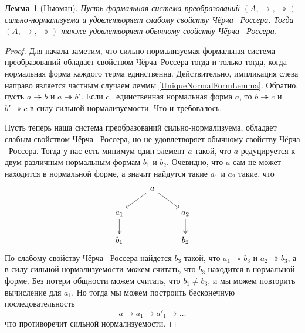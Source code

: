 \documentclass{article}[12pt]
\newtheorem{lemma}{Лемма}
\newcommand{\dash}{\textemdash\ }
\begin{document}
\begin{lemma}[Ньюман]
    \label{NewmanLemma}
    Пусть формальная система преобразований $(A, \rightarrow, \twoheadrightarrow)$ \\ сильно-нормализуема
    и удовлетворяет слабому свойству Чёрча \dash Россера. Тогда $(A, \rightarrow, \twoheadrightarrow)$
    также удовлетворяет обычному свойству Чёрча \dash Россера.
\end{lemma}
\begin{proof}
    Для начала заметим, что сильно-нормализуемая формальная система преобразований обладает свойством
    Чёрча\dash Россера тогда и только тогда, когда нормальная форма каждого терма единственна.
    Действительно, импликация слева направо является частным случаем леммы \ref{UniqueNormalFormLemma}.
    Обратно, пусть $a \twoheadrightarrow b$ и $a \twoheadrightarrow b'$. Если $c$ \dash единственная
    нормальная форма $a$, то $b \twoheadrightarrow c$ и $b' \twoheadrightarrow c$ в силу сильной
    нормализуемости. Что и требовалось.

    Пусть теперь наша система преобразований сильно-нормализуема, обладает слабым свойством Чёрча \dash Россера,
    но не удовлетворяет обычному свойству Чёрча \dash Россера. Тогда у нас есть минимум один
    элемент $a$ такой, что $a$ редуцируется к двум различным нормальным формам $b_1$ и $b_2$.
    Очевидно, что $a$ сам не может находится в нормальной форме, а значит найдутся такие $a_1$ и $a_2$ такие,
    что 
    $$
    \begin{tikzcd}
        & \arrow[ld] a \arrow[rd] & \\
        a_1 \arrow[d, two heads] & & \arrow[d, two heads] a_2 \\
        b_1 &  & b_2
    \end{tikzcd}
    $$
    По слабому свойству Чёрча \dash Россера найдется $b_3$ такой, что $a_1 \twoheadrightarrow b_3$ и
    $a_2 \twoheadrightarrow b_3$, а в силу сильной нормализуемости можем считать, что $b_3$ находится в
    нормальной форме. Без потери общности можем считать, что $b_1 \neq b_3$, и мы можем повторить вычисление
    для $a_1$. Но тогда мы можем построить бесконечную последовательность
    $$a \rightarrow a_1 \rightarrow a'_1 \rightarrow \dots$$
    что противоречит сильной нормализуемости.
\end{proof}
\end{document}
